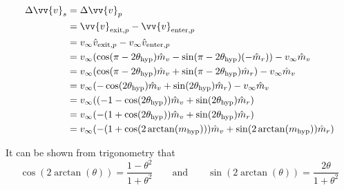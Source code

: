 \documentclass[../basicOrbitalDynamics.tex]{subfiles}
\begin{document}
\begin{align*}
    \Delta\vv{v}_s & = \Delta\vv{v}_p                                                                                             \\
                   & = \vv{v}_{\text{exit},p}-\vv{v}_{\text{enter},p}                                                             \\
                   & = v_\infty\hat{v}_{\text{exit},p}-v_\infty\hat{v}_{\text{enter},p}                                           \\
                   & = v_\infty(\cos(\pi-2\st{\theta}{hyp})\hat{m}_v-\sin(\pi-2\st{\theta}{hyp})(-\hat{m}_r))-v_\infty\hat{m}_v \\
                   & = v_\infty(\cos(\pi-2\st{\theta}{hyp})\hat{m}_v+\sin(\pi-2\st{\theta}{hyp})\hat{m}_r)-v_\infty\hat{m}_v    \\
                   & = v_\infty(-\cos(2\st{\theta}{hyp})\hat{m}_v+\sin(2\st{\theta}{hyp})\hat{m}_r)-v_\infty\hat{m}_v           \\
                   & = v_\infty((-1-\cos(2\st{\theta}{hyp}))\hat{m}_v+\sin(2\st{\theta}{hyp})\hat{m}_r)                         \\
                   & = v_\infty(-(1+\cos(2\st{\theta}{hyp}))\hat{m}_v+\sin(2\st{\theta}{hyp})\hat{m}_r)                         \\
                   & = v_\infty(-(1+\cos(2\arctan(\st{m}{hyp})))\hat{m}_v+\sin(2\arctan(\st{m}{hyp}))\hat{m}_r)                 \\
\end{align*}

It can be shown from trigonometry that
$$\cos(2\arctan(\theta))=\frac{1-\theta^2}{1+\theta^2}\qquad\text{and}\qquad\sin(2\arctan(\theta))=\frac{2\theta}{1+\theta^2}$$

\end{document}
